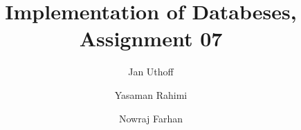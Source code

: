 \documentclass{exercisesheet}
\title{Implementation of Databeses, Assignment 07}
\author{
    Jan Uthoff
    \and
    Yasaman Rahimi
    \and
    Nowraj Farhan
}
\begin{document}
\maketitle

\pointtable


\end{document}
